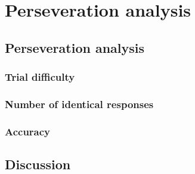 \renewcommand{\chaptername}{Chapter} 
\chapter{Perseveration analysis}\label{chap9}

\section{Perseveration analysis} 
\subsection{Trial difficulty} 

\subsection{Number of identical responses} 

\subsection{Accuracy} 

\section {Discussion} 

